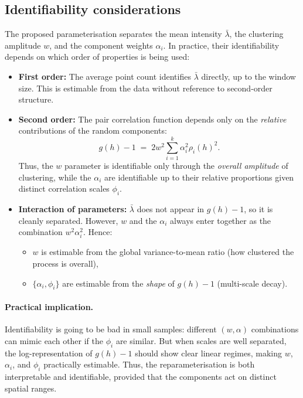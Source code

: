 \documentclass[11pt]{article}
\begin{document}
\subsection{Identifiability considerations}

The proposed parameterisation separates the mean intensity $\bar\lambda$, the clustering amplitude $w$, and the component weights $\alpha_i$.  
In practice, their identifiability depends on which order of properties is being used:

\begin{itemize}
	\item \textbf{First order:} The average point count identifies $\bar\lambda$ directly, up to the window size. This is estimable from the data without reference to second-order structure.
	
	\item \textbf{Second order:} The pair correlation function depends only on the \emph{relative} contributions of the random components:
	\[
	g(h)-1 \;=\; 2w^2 \sum_{i=1}^k \alpha_i^2 \rho_i(h)^2.
	\]
	Thus, the $w$ parameter is identifiable only through the \emph{overall amplitude} of clustering, while the $\alpha_i$ are identifiable up to their relative proportions given distinct correlation scales $\phi_i$.
	
	\item \textbf{Interaction of parameters:} $\bar\lambda$ does not appear in $g(h)-1$, so it is cleanly separated. However, $w$ and the $\alpha_i$ always enter together as the combination $w^2 \alpha_i^2$. Hence:
	\begin{itemize}
		\item $w$ is estimable from the global variance-to-mean ratio (how clustered the process is overall),
		\item $\{\alpha_i,\phi_i\}$ are estimable from the \emph{shape} of $g(h)-1$ (multi-scale decay).
	\end{itemize}
\end{itemize}

\paragraph{Practical implication.}
Identifiability is going to be bad in small samples: different $(w,\alpha)$ combinations can mimic each other if the $\phi_i$ are similar.  
But when scales are well separated, the log-representation of $g(h)-1$ should show clear linear regimes, making $w$, $\alpha_i$, and $\phi_i$ practically estimable.  
Thus, the reparameterisation is both interpretable and identifiable, provided that the components act on distinct spatial ranges.
\end{document}

